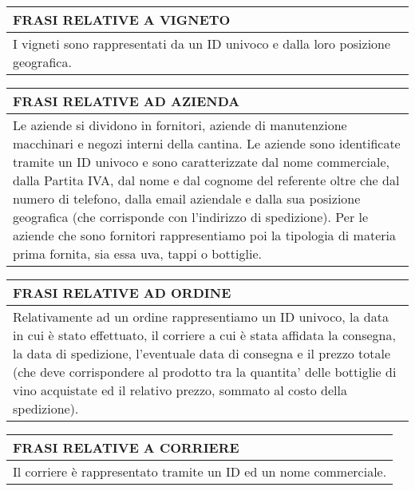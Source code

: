 \begin{center}
	\vspace{0.5cm}
	
	\begin{tabular}{P{16cm}}
		\toprule
		 \textbf {\large {FRASI RELATIVE A VIGNETO}} \\
		\midrule
		I vigneti sono rappresentati da un ID univoco e dalla loro posizione geografica.\\
		\bottomrule
	\end{tabular}
	
	\vspace{0.5cm}
	
	\begin{tabular}{P{16cm}}
		\toprule
		 \textbf {\large {FRASI RELATIVE AD AZIENDA}} \\
		\midrule
		Le aziende si dividono in fornitori, aziende di manutenzione macchinari e negozi interni della cantina. Le aziende sono identificate tramite un ID univoco e sono caratterizzate dal nome commerciale, dalla Partita IVA, dal nome e dal cognome del referente oltre che dal numero di telefono, dalla email aziendale e dalla sua posizione geografica (che corrisponde con l'indirizzo di spedizione). Per le aziende che sono fornitori rappresentiamo poi la tipologia di materia prima fornita, sia essa uva, tappi o bottiglie.\\
		\bottomrule
	\end{tabular}
	
	\vspace{0.5cm}
	
	\begin{tabular}{P{16cm}}
		\toprule
		 \textbf {\large {FRASI RELATIVE AD ORDINE}} \\
		\midrule
		Relativamente ad un ordine rappresentiamo un ID univoco, la data in cui è stato effettuato, il corriere a cui è stata affidata la consegna, la data di spedizione, l'eventuale data di consegna e il prezzo totale (che deve corrispondere al prodotto tra la quantita' delle bottiglie di vino acquistate ed il relativo prezzo, sommato al costo della spedizione).\\
		\bottomrule
	\end{tabular}
	
	\vspace{0.5cm}
	
	\begin{tabular}{P{16cm}}
		\toprule
		 \textbf {\large {FRASI RELATIVE A CORRIERE}} \\
		\midrule
		Il corriere è rappresentato tramite un ID ed un nome commerciale.\\
		\bottomrule
	\end{tabular}
	

\end{center}

